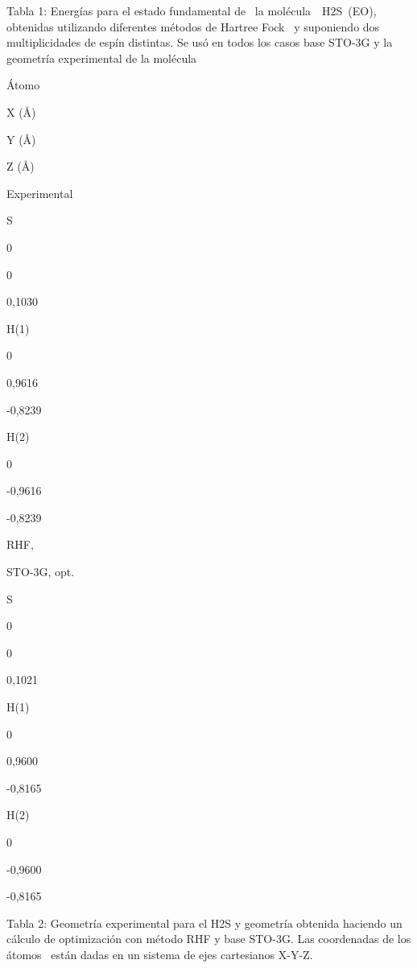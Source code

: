 \documentclass[]{article}
\begin{document}
{}

{Tabla 1}{: Energías para el estado fundamental de ~la
molécula}{~}{~H}{2}{S}{~(E}{O}{)}{, obtenidas utilizando diferentes
métodos de Hartree Fock ~y suponiendo dos multiplicidades de espín
distintas. Se usó en todos los casos base STO-3G y la geometría
experimental de la molécula}

{}

{}

\protect\hypertarget{t.0f39b38b2ec5620d8d8d308b10fc169b45aeca1e}{}{}\protect\hypertarget{t.1}{}{}

{}

{Átomo}

{X (Å)}

{Y (Å)}

{Z (Å)}

{Experimental}

{S}

{0}

{0}

{0,1030}

{H(1)}

{0}

{0,9616}

{-0,8239}

{H(2)}

{0}

{-0,9616}

{-0,8239}

{RHF,}

{STO-3G, opt.}

{S}

{0}

{0}

{0,1021}

{H(1)}

{0}

{0,9600}

{-0,8165}

{H(2)}

{0}

{-0,9600}

{-0,8165}

{}

{Tabla 2}{: Geometría experimental para el H}{2}{S y geometría obtenida
haciendo un cálculo de optimización con método RHF y base STO-3G. Las
coordenadas de los átomos ~están dadas en un sistema de ejes cartesianos
X-Y-Z.}

{}

{}

{}

{}
\end{document}
